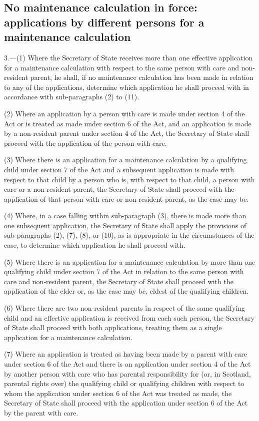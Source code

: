 \documentclass[12pt,a4paper]{article}
\begin{document}
\subsection*{No maintenance calculation in force: applications by different persons for a maintenance calculation}

3.---(1)  Where the Secretary of State receives more than one effective application for a maintenance calculation with respect to the same person with care and non-resident parent, he shall, if no maintenance calculation has been made in relation to any of the applications, determine which application he shall proceed with in accordance with sub-paragraphs (2) to (11).

(2) Where an application by a person with care is made under section 4 of the Act or is treated as made under section 6 of the Act, and an application is made by a non-resident parent under section 4 of the Act, the Secretary of State shall proceed with the application of the person with care.

(3) Where there is an application for a maintenance calculation by a qualifying child under section 7 of the Act and a subsequent application is made with respect to that child by a person who is, with respect to that child, a person with care or a non-resident parent, the Secretary of State shall proceed with the application of that person with care or non-resident parent, as the case may be.

(4) Where, in a case falling within sub-paragraph (3), there is made more than one subsequent application, the Secretary of State shall apply the provisions of sub-paragraphs (2), (7), (8), or (10), as is appropriate in the circumstances of the case, to determine which application he shall proceed with.

(5) Where there is an application for a maintenance calculation by more than one qualifying child under section 7 of the Act in relation to the same person with care and non-resident parent, the Secretary of State shall proceed with the application of the elder or, as the case may be, eldest of the qualifying children.

(6) Where there are two non-resident parents in respect of the same qualifying child and an effective application is received from each such person, the Secretary of State shall proceed with both applications, treating them as a single application for a maintenance calculation.

(7) Where an application is treated as having been made by a parent with care under section 6 of the Act and there is an application under section 4 of the Act by another person with care who has parental responsibility for (or, in Scotland, parental rights over) the qualifying child or qualifying children with respect to whom the application under section 6 of the Act was treated as made, the Secretary of State shall proceed with the application under section 6 of the Act by the parent with care.
\end{document}
